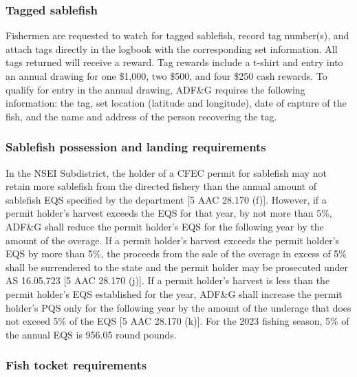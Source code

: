 \documentclass[
]{article}
\begin{document}
\hypertarget{tagged-sablefish}{%
\subsubsection{Tagged sablefish}\label{tagged-sablefish}}

Fishermen are requested to watch for tagged sablefish, record tag
number(s), and attach tags directly in the logbook with the
corresponding set information. All tags returned will receive a reward.
Tag rewards include a t-shirt and entry into an annual drawing for one
\$1,000, two \$500, and four \$250 cash rewards. To qualify for entry in
the annual drawing, ADF\&G requires the following information: the tag,
set location (latitude and longitude), date of capture of the fish, and
the name and address of the person recovering the tag.

\hypertarget{sablefish-possession-and-landing-requirements}{%
\subsubsection{Sablefish possession and landing
requirements}\label{sablefish-possession-and-landing-requirements}}

In the NSEI Subdistrict, the holder of a CFEC permit for sablefish may
not retain more sablefish from the directed fishery than the annual
amount of sablefish EQS specified by the department {[}5 AAC 28.170
(f){]}. However, if a permit holder's harvest exceeds the EQS for that
year, by not more than 5\%, ADF\&G shall reduce the permit holder's EQS
for the following year by the amount of the overage. If a permit
holder's harvest exceeds the permit holder's EQS by more than 5\%, the
proceeds from the sale of the overage in excess of 5\% shall be
surrendered to the state and the permit holder may be prosecuted under
AS 16.05.723 {[}5 AAC 28.170 (j){]}. If a permit holder's harvest is
less than the permit holder's EQS established for the year, ADF\&G shall
increase the permit holder's PQS only for the following year by the
amount of the underage that does not exceed 5\% of the EQS {[}5 AAC
28.170 (k){]}. For the 2023 fishing season, 5\% of the annual EQS is
956.05 round pounds.

\hypertarget{fish-tocket-requirements}{%
\subsubsection{Fish tocket
requirements}\label{fish-tocket-requirements}}
\end{document}
